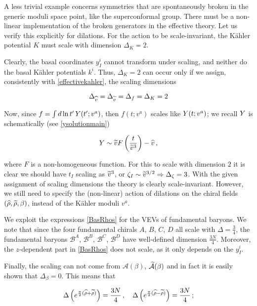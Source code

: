 A less trivial example concerns symmetries that are spontaneously broken in the generic moduli space point, like the superconformal group. There must be a non-linear implementation of the broken generators in the effective theory. Let us verify this explicitly for dilations. For the action to be scale-invariant, the K\"ahler potential $K$ must scale with dimension $\Delta_K = 2$. 

Clearly, the basal coordinates $y^i_I$ cannot transform under scaling, and neither do the basal K\"ahler potentials $k^i$. Thus, $\Delta_K = 2$ can occur only if we assign, consistently with \eqref{effectivekahler}, the scaling dimensions

\begin{equation}
	\Delta_{\widehat{v}} = \Delta_{\widetilde{v}} = \Delta_f = \Delta_K = 2
	\label{}
\end{equation}


Now, since $f = \int d\ln t' \, Y(t';v^a)$, then $f(t;v^a)$ scales like $Y(t;v^a)$; we recall $Y$ is schematically (see \eqref{ysolutionmain})

\begin{equation}
	Y \sim \widetilde{v} F\left( \frac{t}{{\widetilde{v}}^3} \right) - \widehat{v}\,,
	\label{}
\end{equation}

where $F$ is a non-homogeneous function. For this to scale with dimension $2$ it is clear we should have $t_I$ scaling as $\widetilde{v}^3$, or $\zeta_I \sim {\ensuremath{\widetilde{v}}}^{3/2} \Rightarrow \Delta_\zeta = 3$. With the given assignment of scaling dimensions the theory is clearly scale-invariant. However, we still need to specify the (non-linear) action of dilations on the chiral fields $(\widehat{\rho},\widetilde{\rho},\beta)$, instead of the K\"ahler moduli $v^a$. 

We exploit the expressions \eqref{BasRhos} for the VEVs of fundamental baryons. We note that since the four fundamental chirals $A$, $B$, $C$, $D$ all scale with $\Delta = \frac{3}{4}$, the fundamental baryons $\mathcal{B}^A$, $\mathcal{B}^B$, $\mathcal{B}^C$, $\mathcal{B}^D$ have well-defined dimension $\frac{3N}{4}$. Moreover, the $z$-dependent part in \eqref{BasRhos} does not scale, as it only depends on the $y^i_I$. 

Finally, the scaling can not come from $\mathcal{A}(\beta)$, $\widetilde{\mathcal{A}}(\beta)$ and in fact it is easily shown that $\Delta_\beta = 0$. This means that

\begin{equation}
	\Delta \left( e^{\frac{\pi}{2} (\widehat{\rho} + \widetilde{\rho})} \right) = \frac{3N}{4}\,,\quad
	\Delta \left( e^{\frac{\pi}{2} (\widehat{\rho} - \widetilde{\rho})} \right) = \frac{3N}{4}\,;
	\label{}
\end{equation}

